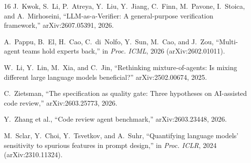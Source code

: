 \documentclass[conference]{IEEEtran}
\begin{document}
\begin{thebibliography}{16}
J.~Kwok, S.~Li, P.~Atreya, Y.~Liu, Y.~Jiang, C.~Finn, M.~Pavone, I.~Stoica,
and A.~Mirhoseini, ``LLM-as-a-Verifier: A general-purpose verification
framework,'' arXiv:2607.05391, 2026.

A.~Pappu, B.~El, H.~Cao, C.~di~Nolfo, Y.~Sun, M.~Cao, and J.~Zou,
``Multi-agent teams hold experts back,'' in \emph{Proc. ICML}, 2026
(arXiv:2602.01011).

W.~Li, Y.~Lin, M.~Xia, and C.~Jin, ``Rethinking mixture-of-agents: Is
mixing different large language models beneficial?'' arXiv:2502.00674,
2025.

C.~Zietsman, ``The specification as quality gate: Three hypotheses on
AI-assisted code review,'' arXiv:2603.25773, 2026.

Y.~Zhang et al., ``Code review agent benchmark,'' arXiv:2603.23448, 2026.

M.~Sclar, Y.~Choi, Y.~Tsvetkov, and A.~Suhr, ``Quantifying language models'
sensitivity to spurious features in prompt design,'' in \emph{Proc. ICLR},
2024 (arXiv:2310.11324).

\end{thebibliography}
\end{document}
